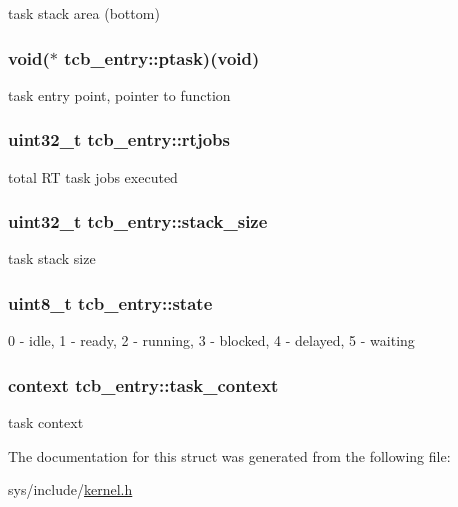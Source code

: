 task stack area (bottom) \hypertarget{structtcb__entry_a7ed7f2d228da0039f065f0c8a756b46d}{
\subsubsection[{ptask}]{\setlength{\rightskip}{0pt plus 5cm}void($\ast$ tcb\-\_\-entry\-::ptask)(void)}}\label{structtcb__entry_a7ed7f2d228da0039f065f0c8a756b46d}
task entry point, pointer to function \hypertarget{structtcb__entry_a51802bc7ba3ee4cfcbcbfb404e606643}{
\subsubsection[{rtjobs}]{\setlength{\rightskip}{0pt plus 5cm}uint32\-\_\-t tcb\-\_\-entry\-::rtjobs}}\label{structtcb__entry_a51802bc7ba3ee4cfcbcbfb404e606643}
total R\-T task jobs executed \hypertarget{structtcb__entry_a2174ff4c5cf178e9dc3d652c472b23dd}{
\subsubsection[{stack\-\_\-size}]{\setlength{\rightskip}{0pt plus 5cm}uint32\-\_\-t tcb\-\_\-entry\-::stack\-\_\-size}}\label{structtcb__entry_a2174ff4c5cf178e9dc3d652c472b23dd}
task stack size \hypertarget{structtcb__entry_a67f430ab50cb8ff9133e133fc240f3d7}{
\subsubsection[{state}]{\setlength{\rightskip}{0pt plus 5cm}uint8\-\_\-t tcb\-\_\-entry\-::state}}\label{structtcb__entry_a67f430ab50cb8ff9133e133fc240f3d7}
0 -\/ idle, 1 -\/ ready, 2 -\/ running, 3 -\/ blocked, 4 -\/ delayed, 5 -\/ waiting \hypertarget{structtcb__entry_a589e6c94b17a97df5d22edf504acfd42}{
\subsubsection[{task\-\_\-context}]{\setlength{\rightskip}{0pt plus 5cm}context tcb\-\_\-entry\-::task\-\_\-context}}\label{structtcb__entry_a589e6c94b17a97df5d22edf504acfd42}
task context 

The documentation for this struct was generated from the following file\-:\begin{DoxyCompactItemize}
\item 
sys/include/\hyperlink{kernel_8h}{kernel.\-h}\end{DoxyCompactItemize}
